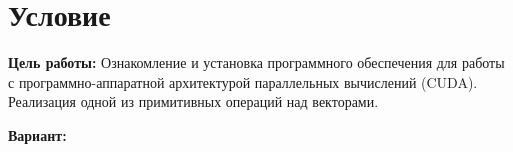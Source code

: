 \section{Условие}
{\bfseries Цель работы:} Ознакомление и установка программного обеспечения для работы с программно-аппаратной архитектурой параллельных вычислений (CUDA). Реализация одной из примитивных операций над векторами.

{\bfseries Вариант:}
